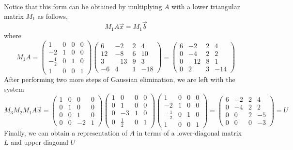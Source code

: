 \begin{example}
\[  \]
  Notice that this form can be obtained by multiplying \(A\) with a lower triangular matrix \(M_{1}\) as follows,
  \[
M_{1} A \vec{x} = M_{1} \vec{b}
\]
  where
  \[
  M_{1} A =
  \begin{pmatrix}
    1 & 0 & 0 & 0\\
    -2 & 1 & 0 & 0\\
    -\frac{1}{2} & 0 & 1 & 0\\
    1 & 0 & 0 & 1
  \end{pmatrix}
  \begin{pmatrix}
    6 & -2 & 2 & 4\\
    12 & -8 & 6 & 10\\
    3 & -13 & 9 & 3\\
    -6 & 4 & 1 & -18
  \end{pmatrix}
=
  \begin{pmatrix}
    6 & -2 & 2 & 4\\
    0 & -4 & 2 & 2\\
    0 & -12 & 8 & 1\\
    0 & 2 & 3 & -14
  \end{pmatrix}
  \]
  After performing two more steps of Gaussian elimination, we are left with the system
  \[
  M_{3}M_{2}M_{1}A \vec{x} =
  \begin{pmatrix}
    1 & 0 & 0 & 0\\
    0 & 1 & 0 & 0\\
    0 & 0 & 1 & 0\\
    0 & 0 & -2 & 1
  \end{pmatrix}
  \begin{pmatrix}
    1 & 0 & 0 & 0\\
    0 & 1 & 0 & 0\\
    0 & -3 & 1 & 0\\
    0 & \frac{1}{2} & 0 & 1
  \end{pmatrix}
  \begin{pmatrix}
    1 & 0 & 0 & 0\\
    -2 & 1 & 0 & 0\\
   -\frac{1}{2} & 0 & 1 & 0\\
   1 & 0 & 0 & 1
  \end{pmatrix}
=
  \begin{pmatrix}
    6 & -2 & 2 & 4\\
    0 & -4 & 2 & 2\\
    0 & 0 & 2 & -5\\
    0 & 0 & 0 & -3
  \end{pmatrix}
  = U
  \]
  Finally, we can obtain a representation of \(A\) in terms of a lower-diagonal matrix \(L\) and upper diagonal \(U\)

\end{example}
